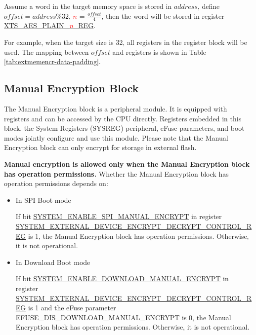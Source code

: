 \documentclass[main\_\_EN.tex]{subfiles}
\begin{document}
Assume a word in the target memory space is stored in \begin{math} address \end{math}, define \begin{math} offset = address \% 32 \end{math}, \textcolor{red}{\it{$n$}} =  \begin{math} \frac{offset}{4} \end{math}, then the word will be stored in register \hyperref[regdesc:XTSAESPLAINNREG]{XTS\_AES\_PLAIN\_\textcolor{red}{\it{n}}\_REG}.

For example, when the target size is 32, all registers in the register block will be used. The mapping between \begin{math} offset \end{math} and registers is shown in Table \ref{tab:extmemencr-data-padding}.




\subsection{Manual Encryption Block}

The Manual Encryption block is a peripheral module. It is equipped with registers and can be accessed by the CPU directly. Registers embedded in this block, the System Registers (SYSREG) peripheral, eFuse parameters, and boot modes jointly configure and use this module. Please note that the Manual Encryption block can only encrypt for storage in external flash.


\textbf{ Manual encryption is allowed only when the Manual Encryption block has operation permissions.} Whether the Manual Encryption block has operation permissions depends on:

\begin{itemize}

    \item In SPI Boot mode

    If bit \hyperref[fielddesc:SYSTEMENABLESPIMANUALENCRYPT]{SYSTEM\_ENABLE\_SPI\_MANUAL\_ENCRYPT} in register\\ \hyperref[regdesc:SYSTEMEXTERNALDEVICEENCRYPTDECRYPTCONTROLREG]{SYSTEM\_EXTERNAL\_DEVICE\_ENCRYPT\_DECRYPT\_CONTROL\_REG} is 1, the Manual Encryption block has operation permissions. Otherwise, it is not operational.

    \item In Download Boot mode

    If bit \hyperref[fielddesc:SYSTEMENABLEDOWNLOADMANUALENCRYPT]{SYSTEM\_ENABLE\_DOWNLOAD\_MANUAL\_ENCRYPT} in register\\ \hyperref[regdesc:SYSTEMEXTERNALDEVICEENCRYPTDECRYPTCONTROLREG]{SYSTEM\_EXTERNAL\_DEVICE\_ENCRYPT\_DECRYPT\_CONTROL\_REG} is 1 and the eFuse parameter\\ EFUSE\_DIS\_DOWNLOAD\_MANUAL\_ENCRYPT is 0, the Manual Encryption block has operation permissions. Otherwise, it is not operational.

\end{itemize}
\end{document}
